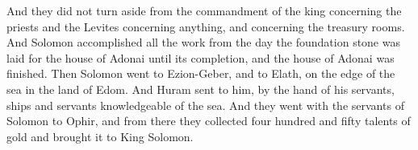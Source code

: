 \begin{biblechapter}
\verse And they did not turn aside from the commandment of the king concerning the priests and the Levites concerning anything, and concerning the treasury rooms.
\verse And Solomon accomplished all the work from the day the foundation stone was laid for the house of Adonai until its completion, and the house of Adonai was finished.
\verse Then Solomon went to Ezion-Geber, and to Elath, on the edge of the sea in the land of Edom.
\verse And Huram sent to him, by the hand of his servants, ships and servants knowledgeable of the sea. And they went with the servants of Solomon to Ophir, and from there they collected four hundred and fifty talents of gold and brought it to King Solomon.
\end{biblechapter}

